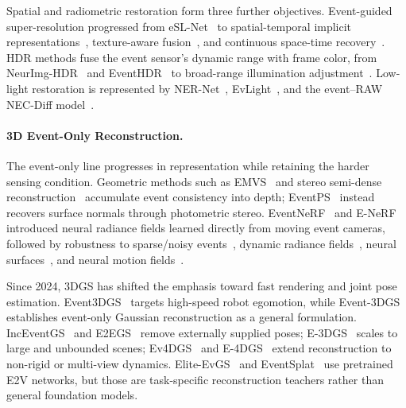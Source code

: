 Spatial and radiometric restoration form three further objectives. Event-guided super-resolution progressed from eSL-Net~\cite{wang2020eslnet} to spatial-temporal implicit representations~\cite{lu2023stir}, texture-aware fusion~\cite{kai2024evtexture}, and continuous space-time recovery~\cite{lu2025evenhancer}. HDR methods fuse the event sensor's dynamic range with frame color, from NeurImg-HDR~\cite{han2023neurimghdr} and EventHDR~\cite{zou2025eventhdr} to broad-range illumination adjustment~\cite{lu2025see}. Low-light restoration is represented by NER-Net~\cite{liu2024rled}, EvLight~\cite{liang2024evlight}, and the event--RAW NEC-Diff model~\cite{liu2026necdiff}.

\paragraph{3D Event-Only Reconstruction.}
\label{sec:recon3d}
The event-only line progresses in representation while retaining the harder sensing condition. Geometric methods such as EMVS~\cite{rebecq2018emvs} and stereo semi-dense reconstruction~\cite{zhou2018semidense} accumulate event consistency into depth; EventPS~\cite{yu2024eventps} instead recovers surface normals through photometric stereo. EventNeRF~\cite{rudnev2023eventnerf} and E-NeRF~\cite{klenk2023enerf} introduced neural radiance fields learned directly from moving event cameras, followed by robustness to sparse/noisy events~\cite{low2023robustenerf}, dynamic radiance fields~\cite{bhattacharya2024evdnerf}, neural surfaces~\cite{sachan2026eventneus}, and neural motion fields~\cite{wang2025enemf}.

Since 2024, 3DGS has shifted the emphasis toward fast rendering and joint pose estimation. Event3DGS~\cite{xiong2024event3dgs} targets high-speed robot egomotion, while Event-3DGS~\cite{lan2024event3dgs} establishes event-only Gaussian reconstruction as a general formulation. IncEventGS~\cite{huang2025inceventgs} and E2EGS~\cite{li2026e2egs} remove externally supplied poses; E-3DGS~\cite{zahid2025e3dgslarge} scales to large and unbounded scenes; Ev4DGS~\cite{liu2025ev4dgs} and E-4DGS~\cite{wang2025e4dgs} extend reconstruction to non-rigid or multi-view dynamics. Elite-EvGS~\cite{zhang2024eliteevgs} and EventSplat~\cite{yura2025eventsplat} use pretrained E2V networks, but those are task-specific reconstruction teachers rather than general foundation models.

